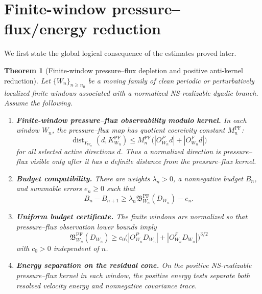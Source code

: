 \documentclass[11pt]{article}
\numberwithin{equation}{section}
\theoremstyle{plain}
\newtheorem{theorem}{Theorem}[section]
\theoremstyle{definition}
\theoremstyle{remark}
\newcommand{\PF}{\mathrm{PF}}
\newcommand{\dist}{\operatorname{dist}}
\newcommand{\bfB}{\mathfrak B}
\begin{document}
\section{Finite-window pressure--flux/energy reduction}
\label{sec:main-theorem}

We first state the global logical consequence of the estimates proved later.


\begin{theorem}[Finite-window pressure--flux depletion and positive anti-kernel reduction]
\label{thm:main-reduction}
Let \(\{W_n\}_{n\ge n_0}\) be a moving family of clean periodic or perturbatively localized finite windows associated with a normalized NS-realizable dyadic branch.  Assume the following.

\begin{enumerate}[label=\textup{(H\arabic*)},leftmargin=2.6em]
    \item \textbf{Finite-window pressure--flux observability modulo kernel.}  In each window \(W_n\), the pressure--flux map has quotient coercivity constant \(M_n^{\PF}\):
    \[
        \dist_{Y_{W_n}}(d,K^{\PF}_{W_n})
        \le
        M_n^{\PF}
        \bigl(|O^P_{W_n}d|+|O^F_{W_n}d|\bigr)
    \]
    for all selected active directions \(d\).  Thus a normalized direction is pressure--flux visible only after it has a definite distance from the pressure--flux kernel.
    \item \textbf{Budget compatibility.}  There are weights \(\lambda_n>0\), a nonnegative budget \(B_n\), and summable errors \(e_n\ge0\) such that
    \begin{equation}
        B_n-B_{n+1}
        \ge
        \lambda_n\bfB^{\PF}_{W_n}(D_{W_n})-e_n.
        \label{eq:main-budget-compatibility}
    \end{equation}
    \item \textbf{Uniform budget certificate.}  The finite windows are normalized so that pressure--flux observation lower bounds imply
    \begin{equation}
        \bfB^{\PF}_{W_n}(D_{W_n})
        \ge
        c_0
        \bigl(|O^P_{W_n}D_{W_n}|+|O^F_{W_n}D_{W_n}|\bigr)^{3/2}
        \label{eq:main-budget-certificate}
    \end{equation}
    with \(c_0>0\) independent of \(n\).
    \item \textbf{Energy separation on the residual cone.}  On the positive NS-realizable pressure--flux kernel in each window, the positive energy tests separate both resolved velocity energy and nonnegative covariance trace.
\end{enumerate}


\end{theorem}
\end{document}
